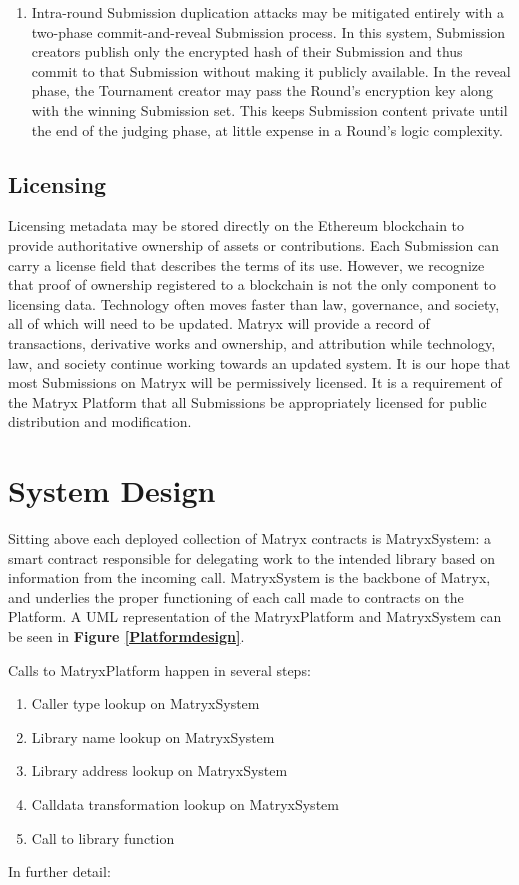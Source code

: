 \documentclass[a4paper, 10pt, conference]{ieeeconf}      %
\begin{document}
\begin{enumerate}
\item Intra-round Submission duplication attacks may be mitigated entirely with a two-phase commit-and-reveal Submission process. 
In this system, Submission creators publish only the encrypted hash of their Submission and thus commit to that Submission without making it publicly available.
In the reveal phase, the Tournament creator may pass the Round's encryption key along with the winning Submission set.
This keeps Submission content private until the end of the judging phase, at little expense in a Round's logic complexity.
\end{enumerate}

\subsection{Licensing}\label{licensing}
Licensing metadata may be stored directly on the Ethereum blockchain to provide authoritative ownership of assets or contributions. 
Each Submission can carry a license field that describes the terms of its use. 
However, we recognize that proof of ownership registered to a blockchain is not the only component to licensing data. 
Technology often moves faster than law, governance, and society, all of which will need to be updated. 
Matryx will provide a record of transactions, derivative works and ownership, and attribution while technology, law, and society continue working towards an updated system. 
It is our hope that most Submissions on Matryx will be permissively licensed. 
It is a requirement of the Matryx Platform that all Submissions be appropriately licensed for public distribution and modification.

\section{System Design}\label{systemdesign}

Sitting above each deployed collection of Matryx contracts is MatryxSystem: a smart contract responsible for delegating work to the intended library based on information from the incoming call. 
MatryxSystem is the backbone of Matryx, and underlies the proper functioning of each call made to contracts on the Platform. A UML representation of the MatryxPlatform and MatryxSystem can be seen in \textbf{Figure \ref{Platformdesign}}.

Calls to MatryxPlatform happen in several steps:
\begin{enumerate}
    \item Caller type lookup on MatryxSystem
    \item Library name lookup on MatryxSystem
    \item Library address lookup on MatryxSystem
    \item Calldata transformation lookup on MatryxSystem
    \item Call to library function
\end{enumerate}
\bigskip
In further detail:
\end{document}
